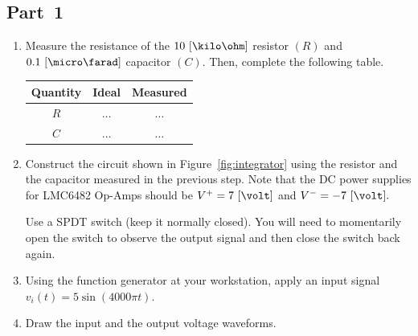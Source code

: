 \subsection{Part~1}   %
\label{sec:part1}
\begin{enumerate}
\item Measure the resistance of the $10~[\kilo\ohm]$ resistor $(R)$ and $0.1~[\micro\farad]$ capacitor $(C).$ Then, complete the following table.
%
  \begin{center}
    \begin{tabular}{c|c|c}
      \toprule
      Quantity &  Ideal & Measured\\
      \toprule
      $R$ & $\ldots$ & $\ldots$\\   %
      $C$ & $\ldots$ & $\ldots$\\   %
      \bottomrule
    \end{tabular}    
  \end{center}
  
\item Construct the circuit shown in Figure~\ref{fig:integrator} using the resistor and the capacitor measured in the previous step. Note that the DC power supplies for LMC6482 Op-Amps should be $V^+=7~[\volt]$ and $V^-=-7~[\volt].$

  Use a SPDT switch (keep it normally closed). You will need  to momentarily open the switch to observe the output signal and then close the switch back again.  

\item  Using the function generator at your workstation, apply an input signal $v_i(t) = 5\sin(4000\pi t).$  


\item Draw the input and the output voltage waveforms.
    
  \begin{center}
    \end{center}

   
\end{enumerate}


